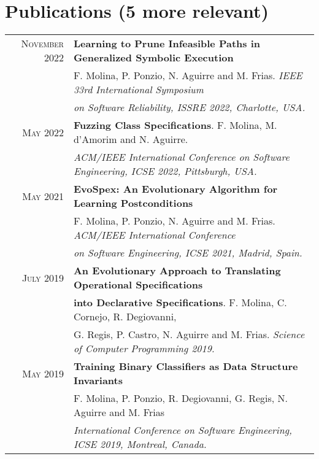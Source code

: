 \documentclass[a4paper,10pt]{article} %
\begin{document}
\section{Publications (5 more relevant)}
\begin{longtable}{rl}

\textsc{November} 2022  & \textbf{Learning to Prune Infeasible Paths in Generalized Symbolic Execution} \\
	& F. Molina, P. Ponzio, N. Aguirre and M. Frias. \textit{{IEEE} 33rd International Symposium} \\
	& \textit{on Software Reliability, {ISSRE} 2022, Charlotte, USA.} \\

\textsc{May} 2022  & \textbf{Fuzzing Class Specifications}. F. Molina, M. d'Amorim and N. Aguirre. \\
	& \textit{ACM/IEEE International Conference on Software Engineering, ICSE 2022, Pittsburgh, USA.} \\

\textsc{May} 2021  & \textbf{EvoSpex: An Evolutionary Algorithm for Learning Postconditions} \\
& F. Molina, P. Ponzio, N. Aguirre and M. Frias. \textit{ACM/IEEE International Conference} \\
& \textit{on Software Engineering, ICSE 2021, Madrid, Spain.} \\

\textsc{July} 2019  & \textbf{An Evolutionary Approach to Translating Operational Specifications} \\ 
& \textbf{into Declarative Specifications}. F. Molina, C. Cornejo, R. Degiovanni, \\ 
& G. Regis, P. Castro, N. Aguirre and M. Frias. \textit{Science of Computer Programming 2019.} \\

\textsc{May} 2019  & \textbf{Training Binary Classifiers as Data Structure Invariants} \\ 
& F. Molina, P. Ponzio, R. Degiovanni, G. Regis, N. Aguirre and M. Frias \\ 
& \textit{International Conference on Software Engineering, ICSE 2019, Montreal, Canada.} \\

\end{longtable}

\end{document}
